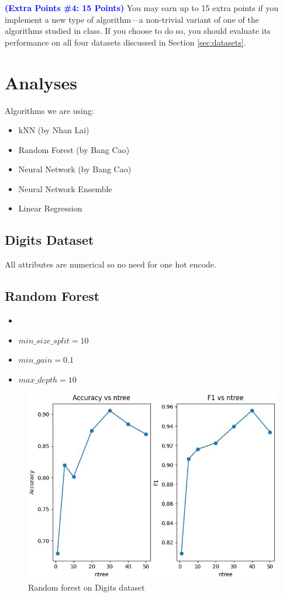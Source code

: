 \documentclass[letterpaper]{article}
\newcommand{\HIGHLIGHT}[1]{\textcolor{blue}{\textbf{#1}}}
\begin{document}
\noindent \HIGHLIGHT{(Extra Points \#4: 15 Points)}
You may earn up to 15 extra points if you implement a new type of algorithm---a non-trivial variant of one of the algorithms studied in class. If you choose to do so, you should evaluate its performance on all four datasets discussed in Section \ref{sec:datasets}.

\section{Analyses}

Algorithms we are using:
\begin{itemize}
	\item kNN (by Nhan Lai)
	\item Random Forest (by Bang Cao)
	\item Neural Network (by Bang Cao)
	\item Neural Network Ensemble
	\item Linear Regression
\end{itemize}

\subsection{Digits Dataset}

All attributes are numerical so no need for one hot encode.

\subsection*{Random Forest}
\begin{itemize}
	\item {}
	\item $min\_size\_split = 10$
	\item $min\_gain = 0.1$
	\item $max\_depth = 10$
\end{itemize}

\begin{figure}[H]
	\includegraphics[width=\textwidth]{figures/forest_digits_ig.jpg}
	\caption{Random forest on Digits dataset}
	\label{fig:forest-digits}
\end{figure}
\end{document}
